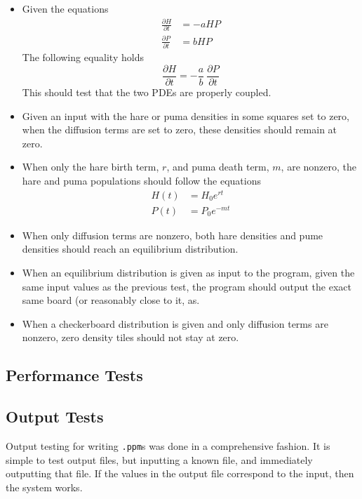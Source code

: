 \begin{itemize}
  \item Given the equations
    \begin{align*}
      \frac{\partial{H}}{\partial{t}} &= -aHP \\
      \frac{\partial{P}}{\partial{t}} &=  bHP
    \end{align*}
    The following equality holds
    \begin{equation*}
      \frac{\partial{H}}{\partial{t}}
        = -\frac{a}{b}\ \frac{\partial{P}}{\partial{t}}
    \end{equation*}
    This should test that the two PDEs are properly coupled.

  \item Given an input with the hare or puma densities in some squares
        set to zero, when the diffusion terms are set to zero, these
        densities should remain at zero.

  \item When only the hare birth term, $r$, and puma death term, $m$, are
        nonzero, the hare and puma populations should follow the equations
        \begin{align*}
          H(t) &= H_0 e^{rt} \\
          P(t) &= P_0 e^{-mt}
        \end{align*}

  \item When only diffusion terms are nonzero, both hare densities and pume
        densities should reach an equilibrium distribution.

  \item When an equilibrium distribution is given as input to the program,
        given the same input values as the previous test, the program should
        output the exact same board (or reasonably close to it, as.

  \item When a checkerboard distribution is given and only diffusion terms
        are nonzero, zero density tiles should not stay at zero.
\end{itemize}


\subsection{Performance Tests}
\subsection{Output Tests}
	Output testing for writing \texttt{.ppm}s was done in a comprehensive fashion.
	It is simple to test output files, but inputting a known file, and immediately outputting that file.
	If the values in the output file correspond to the input, then the system works.

